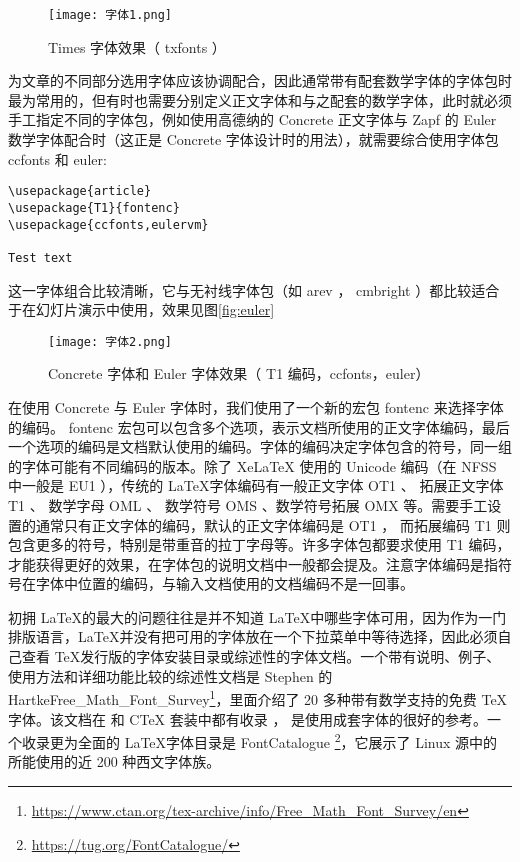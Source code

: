 \begin{figure}[H]
    \centering
    \texttt{[image: 字体1.png]}
    \caption{Times 字体效果（ txfonts ）}
    \label{fig:txfonts}
\end{figure}

为文章的不同部分选用字体应该协调配合，因此通常带有配套数学字体的字体包时最为常用的，但有时也需要分别定义正文字体和与之配套的数学字体，此时就必须手工指定不同的字体包，例如使用高德纳的 Concrete 正文字体与 Zapf 的 Euler 数学字体配合时（这正是 Concrete 字体设计时的用法），就需要综合使用字体包 ccfonts 和 euler:

\begin{lstlisting}
\usepackage{article}
\usepackage{T1}{fontenc}
\usepackage{ccfonts,eulervm}

Test text

\end{lstlisting}

这一字体组合比较清晰，它与无衬线字体包（如 arev ， cmbright ）都比较适合于在幻灯片演示中使用，效果见图\ref{fig:euler}

\begin{figure}[H]
    \centering
    \texttt{[image: 字体2.png]}
    \caption{Concrete 字体和 Euler 字体效果（ T1 编码，ccfonts，euler）}
    \label{fig:ruler}
\end{figure}

在使用 Concrete 与 Euler 字体时，我们使用了一个新的宏包 fontenc 来选择字体的编码。 fontenc 宏包可以包含多个选项，表示文档所使用的正文字体编码，最后一个选项的编码是文档默认使用的编码。字体的编码决定字体包含的符号，同一组的字体可能有不同编码的版本。除了 XeLaTeX 使用的 Unicode 编码（在 NFSS 中一般是 EU1 ），传统的 \LaTeX 字体编码有一般正文字体 OT1 、 拓展正文字体 T1 、 数学字母 OML 、 数学符号 OMS 、数学符号拓展 OMX 等。需要手工设置的通常只有正文字体的编码，默认的正文字体编码是 OT1 ， 而拓展编码 T1 则包含更多的符号，特别是带重音的拉丁字母等。许多字体包都要求使用 T1 编码，才能获得更好的效果，在字体包的说明文档中一般都会提及。注意字体编码是指符号在字体中位置的编码，与输入文档使用的文档编码不是一回事。

初拥 \LaTeX 的最大的问题往往是并不知道 \LaTeX 中哪些字体可用，因为作为一门排版语言，\LaTeX 并没有把可用的字体放在一个下拉菜单中等待选择，因此必须自己查看 \TeX 发行版的字体安装目录或综述性的字体文档。一个带有说明、例子、使用方法和详细功能比较的综述性文档是 Stephen 的 HartkeFree\_Math\_Font\_Survey\footnote{\href{https://www.ctan.org/tex-archive/info/Free\_Math\_Font\_Survey/en}{https://www.ctan.org/tex-archive/info/Free\_Math\_Font\_Survey/en}}，里面介绍了 20 多种带有数学支持的免费 \TeX 字体。该文档在 \texlive 和 CTeX 套装中都有收录 ， 是使用成套字体的很好的参考。一个收录更为全面的 \LaTeX 字体目录是 FontCatalogue \footnote{\href{https://tug.org/FontCatalogue/}{https://tug.org/FontCatalogue/}}，它展示了 Linux 源中的 \texlive 所能使用的近 200 种西文字体族。

